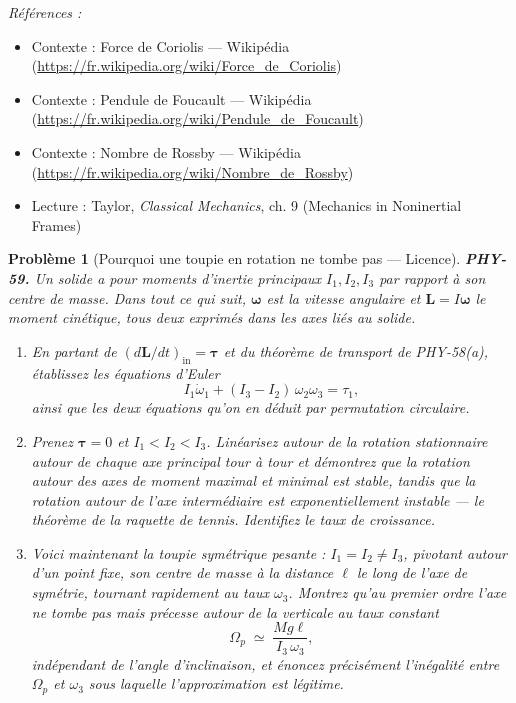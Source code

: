 \documentclass[11pt]{article}
\newtheorem{problem}{Problème}
\newenvironment{refs}{\par\small\noindent\emph{Références :}\begin{itemize}\setlength\itemsep{0pt}}{\end{itemize}\normalsize}
\begin{document}
\begin{refs}
\item Contexte : Force de Coriolis --- Wikipédia (\url{https://fr.wikipedia.org/wiki/Force_de_Coriolis})
\item Contexte : Pendule de Foucault --- Wikipédia (\url{https://fr.wikipedia.org/wiki/Pendule_de_Foucault})
\item Contexte : Nombre de Rossby --- Wikipédia (\url{https://fr.wikipedia.org/wiki/Nombre_de_Rossby})
\item Lecture : Taylor, \textit{Classical Mechanics}, ch. 9 (Mechanics in Noninertial Frames)
\end{refs}

\bigskip

\begin{problem}[{Pourquoi une toupie en rotation ne tombe pas --- Licence}]
\textbf{PHY-59.} Un solide a pour moments d'inertie principaux $ I_{1}, I_{2}, I_{3} $ par
rapport à son centre de masse. Dans tout ce qui suit, $ \boldsymbol{\omega} $ est la vitesse
angulaire et $ \mathbf{L} = I\boldsymbol{\omega} $ le moment cinétique, tous deux exprimés dans
les axes liés au solide.
\begin{enumerate}
\item[(a)] En partant de $ (d\mathbf{L}/dt)_{\text{in}} = \boldsymbol{\tau} $ et du théorème de
transport de PHY-58(a), établissez les équations d'Euler
\[ I_{1}\dot{\omega}_{1} + (I_{3}-I_{2})\,\omega_{2}\omega_{3} = \tau_{1}, \]
ainsi que les deux équations qu'on en déduit par permutation circulaire.
\item[(b)] Prenez $ \boldsymbol{\tau} = 0 $ et $ I_{1} < I_{2} < I_{3} $. Linéarisez autour de
la rotation stationnaire autour de chaque axe principal tour à tour et démontrez que la rotation
autour des axes de moment maximal et minimal est stable, tandis que la rotation autour de l'axe
intermédiaire est exponentiellement instable --- le théorème de la raquette de tennis. Identifiez
le taux de croissance.
\item[(c)] Voici maintenant la toupie symétrique pesante : $ I_{1} = I_{2} \neq I_{3} $, pivotant
autour d'un point fixe, son centre de masse à la distance $ \ell $ le long de l'axe de
symétrie, tournant rapidement au taux $ \omega_{3} $. Montrez qu'au premier ordre l'axe ne tombe
pas mais précesse autour de la verticale au taux constant
\[ \Omega_{p} \;\simeq\; \frac{Mg\ell}{I_{3}\,\omega_{3}}, \]
indépendant de l'angle d'inclinaison, et énoncez précisément l'inégalité entre $ \Omega_{p} $ et
$ \omega_{3} $ sous laquelle l'approximation est légitime.

\end{enumerate}
\end{problem}
\end{document}

